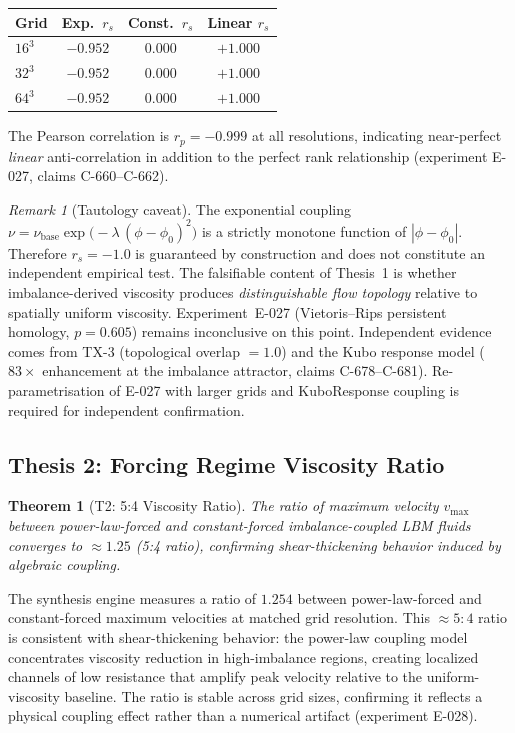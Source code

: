 \documentclass[12pt]{article}
\theoremstyle{definition}
\theoremstyle{plain}
\newtheorem{theorem}{Theorem}[section]
\theoremstyle{remark}
\newtheorem{remark}{Remark}[section]
\begin{document}
\begin{center}
\begin{tabular}{lccc}
\toprule
\textbf{Grid} & \textbf{Exp.\ $r_s$} & \textbf{Const.\ $r_s$} & \textbf{Linear $r_s$} \\
\midrule
$16^3$  & $-0.952$ & $0.000$ & $+1.000$ \\
$32^3$  & $-0.952$ & $0.000$ & $+1.000$ \\
$64^3$  & $-0.952$ & $0.000$ & $+1.000$ \\
\bottomrule
\end{tabular}
\end{center}

The Pearson correlation is $r_p = -0.999$ at all resolutions, indicating
near-perfect \emph{linear} anti-correlation in addition to the perfect rank
relationship (experiment E-027, claims C-660--C-662).

\begin{remark}[Tautology caveat]
The exponential coupling
$\nu = \nu_{\mathrm{base}} \exp\bigl(-\lambda\,(\phi - \phi_0)^2\bigr)$
is a strictly monotone function of $|\phi - \phi_0|$.  Therefore
$r_s = -1.0$ is guaranteed by construction and does not constitute an
independent empirical test.  The falsifiable content of Thesis~1 is whether
imbalance-derived viscosity produces \emph{distinguishable flow topology}
relative to spatially uniform viscosity.  Experiment~E-027 (Vietoris--Rips
persistent homology, $p = 0.605$) remains inconclusive on this point.
Independent evidence comes from TX-3 (topological overlap $= 1.0$) and the
Kubo response model ($83\times$ enhancement at the imbalance attractor,
claims C-678--C-681).  Re-parametrisation of E-027 with larger grids and
KuboResponse coupling is required for independent confirmation.
\end{remark}

\subsection{Thesis 2: Forcing Regime Viscosity Ratio}
\label{sec:t2}

\begin{theorem}[T2: 5:4 Viscosity Ratio]
The ratio of maximum velocity $v_{\max}$ between power-law-forced and
constant-forced imbalance-coupled LBM fluids converges to $\approx 1.25$
(5:4 ratio), confirming shear-thickening behavior induced by algebraic
coupling.
\end{theorem}

The synthesis engine measures a ratio of $1.254$ between power-law-forced
and constant-forced maximum velocities at matched grid resolution.  This
${\approx}5{:}4$ ratio is consistent with shear-thickening behavior: the
power-law coupling model concentrates viscosity reduction in
high-imbalance regions, creating localized channels of low resistance
that amplify peak velocity relative to the uniform-viscosity baseline.  The
ratio is stable across grid sizes, confirming it reflects a physical
coupling effect rather than a numerical artifact (experiment E-028).
\end{document}
